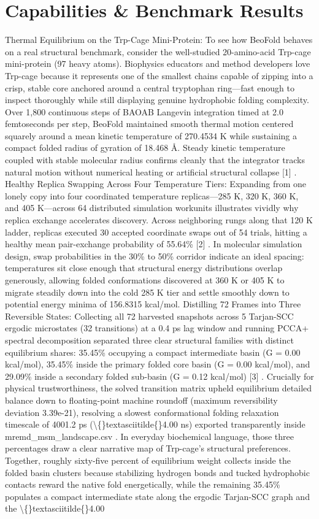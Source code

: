 \documentclass[10pt,letterpaper]{article}
\begin{document}
\section{Capabilities \& Benchmark Results}
Thermal Equilibrium on the Trp-Cage Mini-Protein: To see how BeoFold behaves on a real structural benchmark, consider the well-studied 20-amino-acid Trp-cage mini-protein (97 heavy atoms). Biophysics educators and method developers love Trp-cage because it represents one of the smallest chains capable of zipping into a crisp, stable core anchored around a central tryptophan ring---fast enough to inspect thoroughly while still displaying genuine hydrophobic folding complexity. Over 1,800 continuous steps of BAOAB Langevin integration timed at 2.0 femtoseconds per step, BeoFold maintained smooth thermal motion centered squarely around a mean kinetic temperature of 270.4534 K while sustaining a compact folded radius of gyration of 18.468 Å. Steady kinetic temperature coupled with stable molecular radius confirms cleanly that the integrator tracks natural motion without numerical heating or artificial structural collapse [1] . Healthy Replica Swapping Across Four Temperature Tiers: Expanding from one lonely copy into four coordinated temperature replicas---285 K, 320 K, 360 K, and 405 K---across 64 distributed simulation workunits illustrates vividly why replica exchange accelerates discovery. Across neighboring rungs along that 120 K ladder, replicas executed 30 accepted coordinate swaps out of 54 trials, hitting a healthy mean pair-exchange probability of 55.64\% [2] . In molecular simulation design, swap probabilities in the 30\% to 50\% corridor indicate an ideal spacing: temperatures sit close enough that structural energy distributions overlap generously, allowing folded conformations discovered at 360 K or 405 K to migrate steadily down into the cold 285 K tier and settle smoothly down to potential energy minima of 156.8315 kcal/mol. Distilling 72 Frames into Three Reversible States: Collecting all 72 harvested snapshots across 5 Tarjan-SCC ergodic microstates (32 transitions) at a 0.4 ps lag window and running PCCA+ spectral decomposition separated three clear structural families with distinct equilibrium shares: 35.45\% occupying a compact intermediate basin (G = 0.00 kcal/mol), 35.45\% inside the primary folded core basin (G = 0.00 kcal/mol), and 29.09\% inside a secondary folded sub-basin (G = 0.12 kcal/mol) [3] . Crucially for physical trustworthiness, the solved transition matrix upheld equilibrium detailed balance down to floating-point machine roundoff (maximum reversibility deviation 3.39e-21), resolving a slowest conformational folding relaxation timescale of 4001.2 ps (\textbackslash\{\}textasciitilde\{\}4.00 ns) exported transparently inside mremd\_msm\_landscape.csv . In everyday biochemical language, those three percentages draw a clear narrative map of Trp-cage's structural preferences. Together, roughly sixty-five percent of equilibrium weight collects inside the folded basin clusters because stabilizing hydrogen bonds and tucked hydrophobic contacts reward the native fold energetically, while the remaining 35.45\% populates a compact intermediate state along the ergodic Tarjan-SCC graph and the \textbackslash\{\}textasciitilde\{\}4.00 
\end{document}
